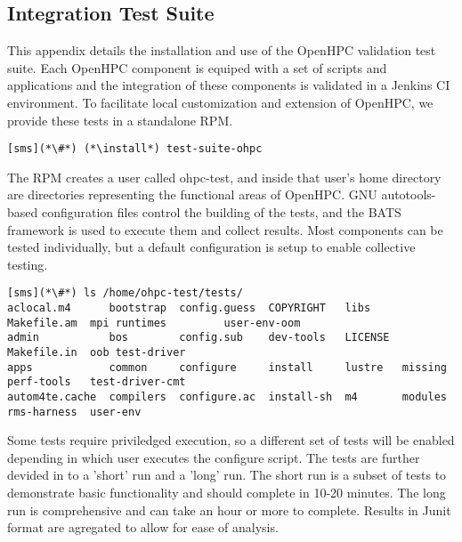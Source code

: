 \subsection{Integration Test Suite}  \label{appendix:test_suite}

This appendix details the installation and use of the OpenHPC validation test
suite. Each OpenHPC component is equiped with a set of scripts and applications
and the integration of these components is validated in a Jenkins CI 
environment. To facilitate local customization and extension of OpenHPC, we 
provide these tests in a standalone RPM. 

\begin{lstlisting}
[sms](*\#*) (*\install*) test-suite-ohpc
\end{lstlisting}

The RPM creates a user called ohpc-test, and inside that user's home directory 
are directories representing the functional areas of OpenHPC. GNU 
autotools-based configuration files control the building of the tests, and the
BATS framework is used to execute them and collect results. Most components can
be tested individually, but a default configuration is setup to enable 
collective testing.

\begin{lstlisting}
[sms](*\#*) ls /home/ohpc-test/tests/
aclocal.m4      bootstrap  config.guess  COPYRIGHT   libs     Makefile.am  mpi runtimes         user-env-oom
admin           bos        config.sub    dev-tools   LICENSE  Makefile.in  oob test-driver
apps            common     configure     install     lustre   missing perf-tools   test-driver-cmt
autom4te.cache  compilers  configure.ac  install-sh  m4       modules rms-harness  user-env
\end{lstlisting}

Some tests require priviledged execution, so a different set of tests will be
enabled depending in which user executes the configure script. The tests are
further devided in to a 'short' run and a 'long' run. The short run is a subset
of tests to demonstrate basic functionality and should complete in 10-20 
minutes. The long run is comprehensive and can take an hour or more to complete.
Results in Junit format are agregated to allow for ease of analysis.


